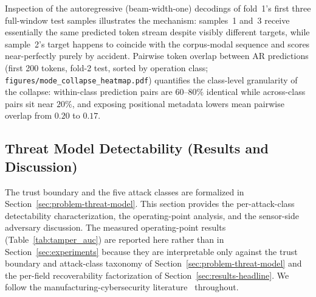 \documentclass[sensors,article,submit,moreauthors,pdftex]{Definitions/mdpi}
\begin{document}
Inspection of the autoregressive (beam-width-one) decodings of fold~1's first three full-window test samples illustrates the mechanism: samples~1 and~3 receive essentially the same predicted token stream despite visibly different targets, while sample~2's target happens to coincide with the corpus-modal sequence and scores near-perfectly purely by accident. Pairwise token overlap between AR predictions (first 200 tokens, fold-2 test, sorted by operation class; \texttt{figures/mode\_collapse\_heatmap.pdf}) quantifies the class-level granularity of the collapse: within-class prediction pairs are $60$--$80\%$ identical while across-class pairs sit near $20\%$, and exposing positional metadata lowers mean pairwise overlap from $0.20$ to $0.17$.


\subsection{Threat Model Detectability (Results and Discussion)}
\label{sec:disc-threat-model}

The trust boundary and the five attack classes are formalized in Section~\ref{sec:problem-threat-model}. This section provides the per-attack-class detectability characterization, the operating-point analysis, and the sensor-side adversary discussion. The measured operating-point results (Table~\ref{tab:tamper_auc}) are reported here rather than in Section~\ref{sec:experiments} because they are interpretable only against the trust boundary and attack-class taxonomy of Section~\ref{sec:problem-threat-model} and the per-field recoverability factorization of Section~\ref{sec:results-headline}. We follow the manufacturing-cybersecurity literature~\cite{sturm2014cyber,yampolskiy2018security,kimmell2025cnc,zonouz2014plc,belikovetsky2017drowned,nist2023sp80082} throughout.
\end{document}
